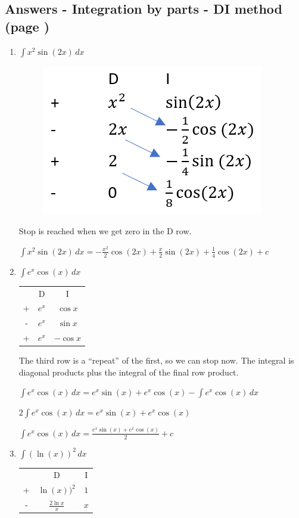 \documentclass[../main.tex]{subfiles}
\begin{document}
\subsection*{Answers - Integration by parts - DI method (page \pageref{DI Method})}
\label{DI method answers}
\begin{enumerate}
    \item \(\int x^2\sin{(2x)}\, dx\)
    
    \begin{figure}[h]
    \setlength\parindent{30pt}
        \includegraphics[width=0.25\linewidth]{images/di_a1.png}
    \end{figure}
    
    Stop is reached when we get zero in the D row.

    \(\int x^2\sin{(2x)}\, dx=-\frac{x^2}{2}\cos{(2x)}+\frac{x}{2}\sin{(2x)}+\frac{1}{4}\cos{(2x)}+c\)

    \item \(\int e^x \cos{(x)}\, dx\)
    
    \begin{tabular}{ c c c }
       & D & I \\ 
     +  & $e^x$ &$\cos{x}$ \\  
     - & $e^x$ & $\sin{x}$\\
      + & $e^x$ & $-\cos{x}$ \\  
    \end{tabular}

    The third row is a “repeat” of the first, so we can stop now. The integral is diagonal products plus the integral of the final row product.

    \(\int e^x \cos{(x)}\, dx = e^x\sin{(x)}+e^x\cos{(x)}-\int e^x\cos{(x)}\,dx\)

    \(2\int e^x \cos{(x)}\, dx= e^x\sin{(x)}+e^x\cos{(x)}\)

    \(\int e^x \cos{(x)}\, dx=\frac{e^x\sin{(x)}+e^x\cos{(x)}}{2}+c\)
    
    \item \(\int (\ln{(x)})^2\, dx\)
    
    \begin{tabular}{ c c c }
       & D & I \\ 
     +  & $\ln{(x)})^2$ &$1$ \\  
     - & $\frac{2\ln{x}}{x}$ & $x$\\ 
    \end{tabular}


\end{enumerate}
\end{document}
